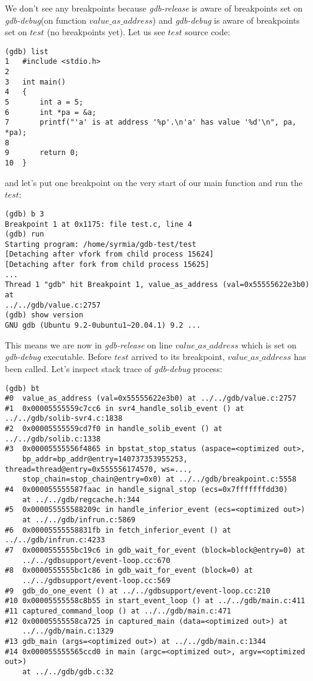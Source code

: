\documentclass{report}
\begin{document}
We don't see any breakpoints because \textit{gdb-release} is aware of breakpoints set on \textit{gdb-debug}(on function $value\_as\_address$) and \textit{gdb-debug} is aware of breakpoints set on $test$ (no breakpoints yet). Let us see $test$ source  code:
\begin{verbatim}
(gdb) list
1   #include <stdio.h>
2	
3	int main()
4	{
5		int a = 5;
6		int *pa = &a;
7		printf("'a' is at address '%p'.\n'a' has value '%d'\n", pa, *pa);
8	
9		return 0;
10	}
\end{verbatim}
and let's put one breakpoint on the very start of our main function and run the $test$:
\begin{verbatim}
(gdb) b 3
Breakpoint 1 at 0x1175: file test.c, line 4
(gdb) run
Starting program: /home/syrmia/gdb-test/test 
[Detaching after vfork from child process 15624]
[Detaching after fork from child process 15625]
...
Thread 1 "gdb" hit Breakpoint 1, value_as_address (val=0x55555622e3b0) at 
../../gdb/value.c:2757
(gdb) show version
GNU gdb (Ubuntu 9.2-0ubuntu1~20.04.1) 9.2 ...
\end{verbatim}
This means we are now in \textit{gdb-release} on line $value\_as\_address$ which is set on \textit{gdb-debug} executable. Before $test$ arrived to its breakpoint, $value\_as\_address$ has been called. Let's inspect stack trace of \textit{gdb-debug} process:
\begin{verbatim}
(gdb) bt
#0  value_as_address (val=0x55555622e3b0) at ../../gdb/value.c:2757
#1  0x00005555559c7cc6 in svr4_handle_solib_event () at ../../gdb/solib-svr4.c:1838
#2  0x00005555559cd7f0 in handle_solib_event () at ../../gdb/solib.c:1338
#3  0x00005555556f4865 in bpstat_stop_status (aspace=<optimized out>, 
    bp_addr=bp_addr@entry=140737353955253, thread=thread@entry=0x555556174570, ws=..., 
    stop_chain=stop_chain@entry=0x0) at ../../gdb/breakpoint.c:5558
#4  0x000055555587faac in handle_signal_stop (ecs=0x7fffffffdd30) 
    at ../../gdb/regcache.h:344
#5  0x000055555588209c in handle_inferior_event (ecs=<optimized out>) 
    at ../../gdb/infrun.c:5869
#6  0x00005555558831fb in fetch_inferior_event () at ../../gdb/infrun.c:4233
#7  0x0000555555bc19c6 in gdb_wait_for_event (block=block@entry=0) at 
    ../../gdbsupport/event-loop.cc:670
#8  0x0000555555bc1c86 in gdb_wait_for_event (block=0) at 
    ../../gdbsupport/event-loop.cc:569
#9  gdb_do_one_event () at ../../gdbsupport/event-loop.cc:210
#10 0x00005555558c8b55 in start_event_loop () at ../../gdb/main.c:411
#11 captured_command_loop () at ../../gdb/main.c:471
#12 0x00005555558ca725 in captured_main (data=<optimized out>) at 
    ../../gdb/main.c:1329
#13 gdb_main (args=<optimized out>) at ../../gdb/main.c:1344
#14 0x000055555565ccd0 in main (argc=<optimized out>, argv=<optimized out>) 
    at ../../gdb/gdb.c:32
\end{verbatim}
\end{document}
